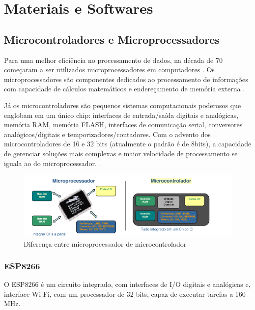 \chapter{Materiais e Softwares}

\section{Microcontroladores e Microprocessadores}

Para uma melhor eficiência no processamento de dados, na década de 70
começaram a ser utilizados microprocessadores em computadores \cite{martins2005sistemas}. Os microprocessadores são componentes dedicados ao processamento de informações com
capacidade de cálculos matemáticos e endereçamento de memória externa \cite{chase2007sistemas}.

Já os microcontroladores são pequenos sistemas computacionais poderosos que englobam em um único chip: interfaces de entrada/saída digitais e analógicas, memória RAM, memória FLASH, interfaces de comunicação serial, conversores analógicos/digitais e temporizadores/contadores. Com o advento dos microcontroladores de 16 e 32 bits (atualmente o padrão é de 8bits), a capacidade de gerenciar soluções mais complexas e maior velocidade de processamento se iguala ao do microprocessador. \cite{chase2007sistemas}.

\begin{figure}[htbp]
	\centering
	\includegraphics[scale=0.7]{figuras/processa-controla.png}
	\caption{Diferença entre microprocessador de microcontrolador}
	\label{microprocessador-microcontrolador}
\end{figure}

\subsection{ESP8266}

O ESP8266 é um circuito integrado, com interfaces de I/O digitais e analógicas e, interface Wi-Fi, com um processador de 32 bits, capaz de executar tarefas a 160 MHz.

